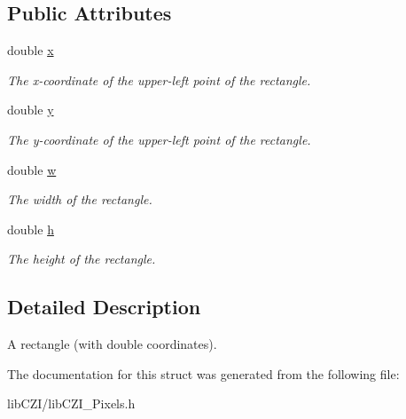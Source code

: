 \subsection*{Public Attributes}
\begin{DoxyCompactItemize}
\item 
\mbox{\label{structlib_c_z_i_1_1_dbl_rect_a8f92b6a3e150fa3a89d4dd5eb993ae19}} 
double \hyperlink{structlib_c_z_i_1_1_dbl_rect_a8f92b6a3e150fa3a89d4dd5eb993ae19}{x}
\begin{DoxyCompactList}\small\item\em The x-\/coordinate of the upper-\/left point of the rectangle. \end{DoxyCompactList}\item 
\mbox{\label{structlib_c_z_i_1_1_dbl_rect_a3707799e08d5738981bb705496ff91f3}} 
double \hyperlink{structlib_c_z_i_1_1_dbl_rect_a3707799e08d5738981bb705496ff91f3}{y}
\begin{DoxyCompactList}\small\item\em The y-\/coordinate of the upper-\/left point of the rectangle. \end{DoxyCompactList}\item 
\mbox{\label{structlib_c_z_i_1_1_dbl_rect_a19153011d443de0d64924db9d10d4af8}} 
double \hyperlink{structlib_c_z_i_1_1_dbl_rect_a19153011d443de0d64924db9d10d4af8}{w}
\begin{DoxyCompactList}\small\item\em The width of the rectangle. \end{DoxyCompactList}\item 
\mbox{\label{structlib_c_z_i_1_1_dbl_rect_a00b8d612c3f621b56f6950f5803a0298}} 
double \hyperlink{structlib_c_z_i_1_1_dbl_rect_a00b8d612c3f621b56f6950f5803a0298}{h}
\begin{DoxyCompactList}\small\item\em The height of the rectangle. \end{DoxyCompactList}\end{DoxyCompactItemize}


\subsection{Detailed Description}
A rectangle (with double coordinates). 

The documentation for this struct was generated from the following file\+:\begin{DoxyCompactItemize}
\item 
lib\+C\+Z\+I/lib\+C\+Z\+I\+\_\+\+Pixels.\+h\end{DoxyCompactItemize}
